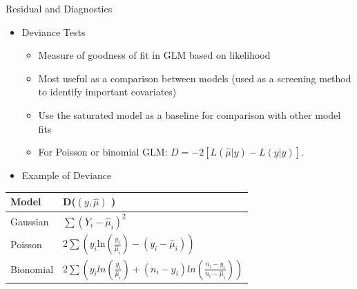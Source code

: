 \documentclass[ignorenonframetext,]{beamer}
\providecommand{\tightlist}{%
  \setlength{\itemsep}{0pt}\setlength{\parskip}{0pt}}
\begin{document}
\begin{frame}{Residual and Diagnostics}

\begin{itemize}
\tightlist
\item
  Deviance Tests

  \begin{itemize}
  \tightlist
  \item
    Measure of goodness of fit in GLM based on likelihood
  \item
    Most useful as a comparison between models (used as a screening
    method to identify important covariates)
  \item
    Use the saturated model as a baseline for comparison with other
    model fits
  \item
    For Poisson or binomial GLM: \(D = -2[L(\hat\mu|y)-L(y|y)]\).
  \end{itemize}
\item
  Example of Deviance
\end{itemize}

\begin{longtable}[]{@{}ll@{}}
\toprule
\begin{minipage}[b]{0.14\columnwidth}\raggedright\strut
Model\strut
\end{minipage} & \begin{minipage}[b]{0.47\columnwidth}\raggedright\strut
D(\((y, \hat\mu)\) )\strut
\end{minipage}\tabularnewline
\midrule
\endhead
\begin{minipage}[t]{0.14\columnwidth}\raggedright\strut
Gaussian\strut
\end{minipage} & \begin{minipage}[t]{0.47\columnwidth}\raggedright\strut
\(\sum(Y_i-\hat\mu_i)^2\)\strut
\end{minipage}\tabularnewline
\begin{minipage}[t]{0.14\columnwidth}\raggedright\strut
Poisson\strut
\end{minipage} & \begin{minipage}[t]{0.47\columnwidth}\raggedright\strut
\(2\sum(y_i\text{ln}(\frac{y_i}{\hat\mu_i})-(y_i-\hat\mu_i))\)\strut
\end{minipage}\tabularnewline
\begin{minipage}[t]{0.14\columnwidth}\raggedright\strut
Bionomial\strut
\end{minipage} & \begin{minipage}[t]{0.47\columnwidth}\raggedright\strut
\(2\sum(y_iln(\frac{y_i}{\hat\mu_i})+(n_i-y_i) ln(\frac{n_i-y_i}{n_i-\hat\mu_i}))\)\strut
\end{minipage}\tabularnewline
\bottomrule
\end{longtable}

\end{frame}
\end{document}
